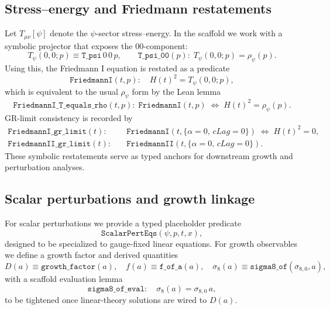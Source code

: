\documentclass[aps,prd,twocolumn,superscriptaddress,nofootinbib,floatfix,longbibliography]{revtex4-2}
\begin{document}
\subsection{Stress--energy and Friedmann restatements}
Let $T_{\mu\nu}[\psi]$ denote the $\psi$-sector stress--energy. In the scaffold we work with a symbolic projector that exposes the $00$-component:
\begin{equation}
  T_{\psi}(0,0; p) \equiv \texttt{T\_psi}\,0\,0\,p,\qquad
  \texttt{T\_psi\_00}(p):\; T_{\psi}(0,0; p) = \rho_{\psi}(p).
\end{equation}
Using this, the Friedmann I equation is restated as a predicate
\begin{equation}
  \texttt{FriedmannI}(t,p):\quad H(t)^2 = T_{\psi}(0,0; p),
\end{equation}
which is equivalent to the usual $\rho_{\psi}$ form by the Lean lemma
\begin{equation}
  \texttt{FriedmannI\_T\_equals\_rho}(t,p):\;
  \texttt{FriedmannI}(t,p) \;\Leftrightarrow\; H(t)^2 = \rho_{\psi}(p).
\end{equation}
GR-limit consistency is recorded by
\begin{align}
  \texttt{FriedmannI\_gr\_limit}(t):&\quad
  \texttt{FriedmannI}\!\left(t,\{ \alpha{=}0,\,cLag{=}0\}\right)
  \;\Leftrightarrow\; H(t)^2 = 0,\\
  \texttt{FriedmannII\_gr\_limit}(t):&\quad
  \texttt{FriedmannII}\!\left(t,\{ \alpha{=}0,\,cLag{=}0\}\right).
\end{align}
These symbolic restatements serve as typed anchors for downstream growth and perturbation analyses.

\subsection{Scalar perturbations and growth linkage}
For scalar perturbations we provide a typed placeholder predicate
\begin{equation}
  \texttt{ScalarPertEqs}(\psi, p, t, x),
\end{equation}
designed to be specialized to gauge-fixed linear equations. For growth observables we define a growth factor and derived quantities
\begin{equation}
  D(a) \equiv \texttt{growth\_factor}(a),\quad
  f(a) \equiv \texttt{f\_of\_a}(a),\quad
  \sigma_8(a) \equiv \texttt{sigma8\_of}(\sigma_{8,0}, a),
\end{equation}
with a scaffold evaluation lemma
\begin{equation}
  \texttt{sigma8\_of\_eval}:\quad
  \sigma_8(a) = \sigma_{8,0}\,a,
\end{equation}
to be tightened once linear-theory solutions are wired to $D(a)$.
\end{document}
